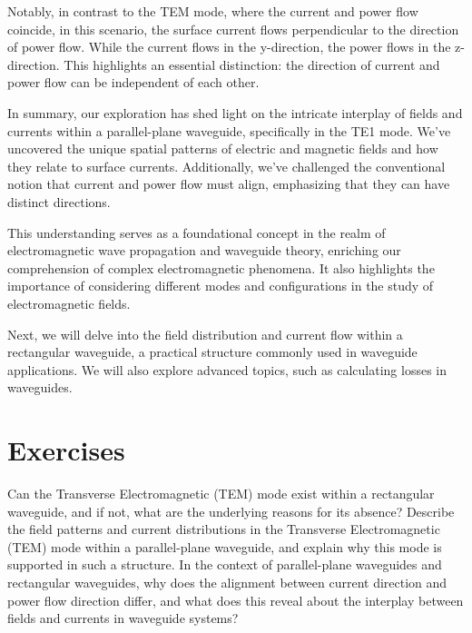 Notably, in contrast to the TEM mode, where the current and power flow coincide, in this scenario, the surface current flows perpendicular to the direction of power flow. While the current flows in the y-direction, the power flows in the z-direction. This highlights an essential distinction: the direction of current and power flow can be independent of each other.

In summary, our exploration has shed light on the intricate interplay of fields and currents within a parallel-plane waveguide, specifically in the TE1 mode. We've uncovered the unique spatial patterns of electric and magnetic fields and how they relate to surface currents. Additionally, we've challenged the conventional notion that current and power flow must align, emphasizing that they can have distinct directions.

This understanding serves as a foundational concept in the realm of electromagnetic wave propagation and waveguide theory, enriching our comprehension of complex electromagnetic phenomena. It also highlights the importance of considering different modes and configurations in the study of electromagnetic fields.

Next, we will delve into the field distribution and current flow within a rectangular waveguide, a practical structure commonly used in waveguide applications. We will also explore advanced topics, such as calculating losses in waveguides.

\section*{Exercises}
\begin{ExerciseList}
\Exercise[label={ex401}]
Can the Transverse Electromagnetic (TEM) mode exist within a rectangular waveguide, and if not, what are the underlying reasons for its absence?
\Exercise[label={ex402}]
Describe the field patterns and current distributions in the Transverse Electromagnetic (TEM) mode within a parallel-plane waveguide, and explain why this mode is supported in such a structure.
\Exercise[label={ex403}]
In the context of parallel-plane waveguides and rectangular waveguides, why does the alignment between current direction and power flow direction differ, and what does this reveal about the interplay between fields and currents in waveguide systems?
\end{ExerciseList}

